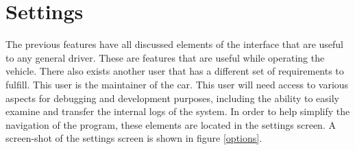 

\section{Settings}

The previous features have all discussed elements of the interface that are useful to any general driver. These are features that are useful while operating the vehicle. There also exists another user that has a different set of requirements to fulfill. This user is the maintainer of the car. This user will need access to various aspects for debugging and development purposes, including the ability to easily examine and transfer the internal logs of the system. In order to help simplify the navigation of the program, these elements are located in the settings screen. A screen-shot of the settings screen is shown in figure \ref{options}.




